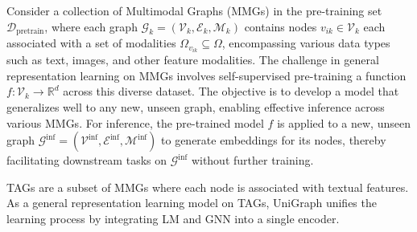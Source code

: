 \begin{problem}
Consider a collection of Multimodal Graphs (MMGs) in the pre-training set \( \mathcal{D}_{\text{pretrain}} \), where each graph \( \mathcal{G}_{k} = (\mathcal{V}_k, \mathcal{E}_k, \mathcal{M}_k) \) contains nodes \( v_{ik} \in \mathcal{V}_k \) each associated with a set of modalities \( \Omega_{v_{ik}} \subseteq \Omega \), encompassing various data types such as text, images, and other feature modalities. The challenge in general representation learning on MMGs involves self-supervised pre-training a function \( f: \mathcal{V}_k \rightarrow \mathbb{R}^d \) across this diverse dataset. The objective is to develop a model that generalizes well to any new, unseen graph, enabling effective inference across various MMGs. For inference, the pre-trained model \( f \) is applied to a new, unseen graph \( \mathcal{G}^{\text{inf}} = (\mathcal{V}^{\text{inf}}, \mathcal{E}^{\text{inf}}, \mathcal{M}^{\text{inf}}) \) to generate embeddings for its nodes, thereby facilitating downstream tasks on \( \mathcal{G}^{\text{inf}} \) without further training.
\end{problem}



TAGs are a subset of MMGs where each node is associated with textual features. 
As a general representation learning model on TAGs, 
UniGraph unifies the learning process by integrating LM and GNN into a single encoder.


